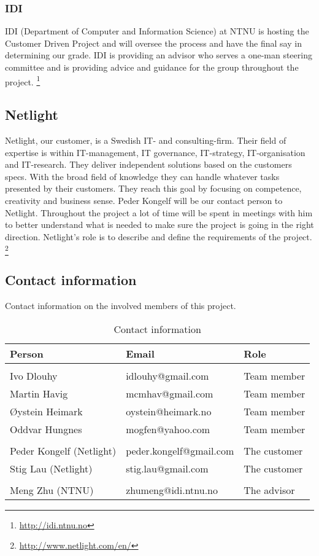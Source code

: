 \subsubsection{IDI}
IDI (Department of Computer and Information Science) at NTNU is hosting the Customer Driven Project and will oversee the process and have the final say in determining our grade. IDI is providing an advisor who serves a one-man steering committee and is providing advice and guidance for the group throughout the project.
\footnote{\url{http://idi.ntnu.no}}

\subsection{Netlight}
Netlight, our customer, is a Swedish IT- and consulting-firm. Their field of expertise is within IT-management, IT governance, IT-strategy, IT-organisation and IT-research. They deliver independent solutions based on the customers specs. With the broad field of knowledge they can handle whatever tasks presented by their customers. They reach this goal by focusing on competence, creativity and business sense. 
Peder Kongelf will be our contact person to Netlight. Throughout the project a lot of time will be spent in meetings with him to better understand what is needed to make sure the project is going in the right direction. Netlight's role is to describe and define the requirements of the project.
\footnote{\url{http://www.netlight.com/en/}}

\subsection{Contact information}
Contact information on the involved members of this project.
\begin{table}
\centering
\caption{Contact information}
\begin{tabular}{ l  l  l  }
 \textbf{Person} & \textbf{Email} & \textbf{Role} \\ 
\hline \\[-2.0ex]
 Ivo Dlouhy & idlouhy@gmail.com & Team member \\
 Martin Havig & mcmhav@gmail.com & Team member \\
 Øystein Heimark & oystein@heimark.no & Team member \\
 Oddvar Hungnes & mogfen@yahoo.com & Team member \\ 
\hline \\[-2.0ex]
 Peder Kongelf (Netlight) & peder.kongelf@gmail.com & The customer \\
 Stig Lau (Netlight) & stig.lau@gmail.com & The customer \\ 
\hline \\[-2.0ex]
  Meng Zhu (NTNU) & zhumeng@idi.ntnu.no & The advisor \\ 
\hline
\end{tabular}
\end{table}


